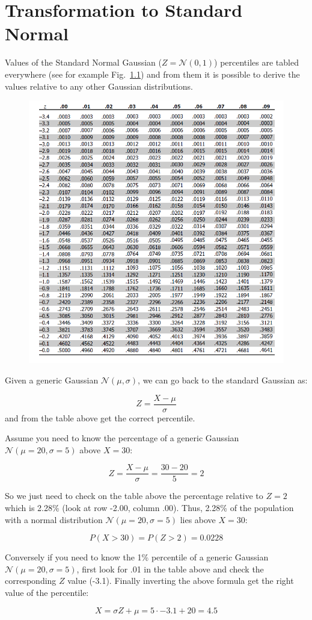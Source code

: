 \chapter{Transformation to Standard
  Normal}\label{transformation-to-standard-normal}

Values of the Standard Normal Gaussian (\(Z = \mathcal{N}(0,1)\)) percentiles are tabled everywhere (see for example Fig.~\ref{fig:normpercentile}) and from them it is possible to derive the values relative to any other Gaussian distributions.

\begin{figure}[tb]
\centering
\includegraphics[width=1.\textwidth]{figures/norm_gauss_percentile}
\label{fig:normpercentile}
\end{figure}

Given a generic Gaussian \(\mathcal{N}(\mu , \sigma)\), we can go back to the standard Gaussian as:

\begin{equation}
Z = \frac{X-\mu}{\sigma}
\end{equation}
and from the table above get the correct percentile.

Assume you need to know the percentage of a generic Gaussian \(\mathcal{N}(\mu=20 ,\sigma=5)\) above \(X=30\):

\[Z=\frac{X-\mu}{\sigma} = \frac{30-20}{5}=2\]

So we just need to check on the table above the percentage relative to \(Z=2\) which is 2.28\% (look at row -2.00, column .00). Thus, 2.28\% of the population with a normal distribution \(\mathcal{N}(\mu=20 ,\sigma=5)\) lies above \(X=30\):

\[P(X>30)=P(Z>2)=0.0228\]

Conversely if you need to know the 1\% percentile of a generic Gaussian \(\mathcal{N}(\mu=20 ,\sigma=5)\), first look for .01 in the table above and check the corresponding \(Z\) value (-3.1). Finally inverting the above formula get the right value of the percentile:

\[ X= \sigma Z + \mu = 5\cdot -3.1 + 20 = 4.5 \]
